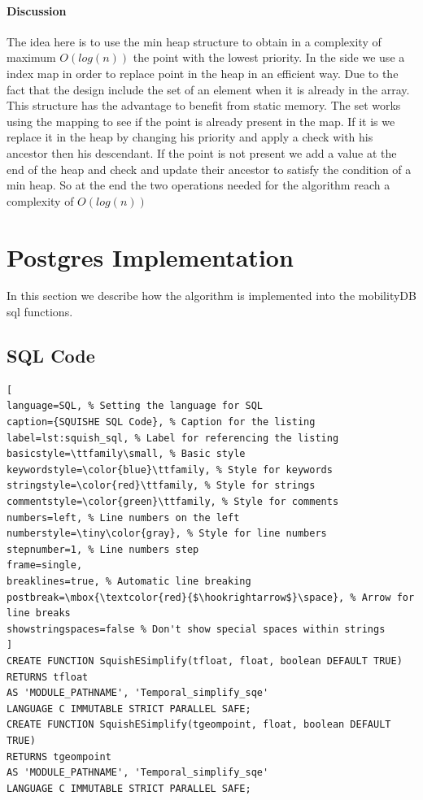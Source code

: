 \paragraph{Discussion}

The idea here is to use the min heap structure to obtain in a complexity of maximum $O(log(n))$  the point with the lowest priority. In the side we use a index map in order to replace point in the heap in an efficient way. Due to the fact that the design include the set of an element when it is already in the array. This structure has the advantage to benefit from static memory. The set works using the mapping to see if the point is already present in the map. If it is we replace it in the heap by changing his priority and apply a check with his ancestor then his descendant. If the point is not present we add a value at the end of the heap and check and update their ancestor to satisfy the condition of a min heap. So at the end the two operations needed for the algorithm reach a complexity of $O(log(n))$

\section{Postgres Implementation}

In this section we describe how the algorithm is implemented into the mobilityDB sql functions.
\subsection{SQL Code}

\begin{lstlisting}[
language=SQL, % Setting the language for SQL
caption={SQUISHE SQL Code}, % Caption for the listing
label=lst:squish_sql, % Label for referencing the listing
basicstyle=\ttfamily\small, % Basic style
keywordstyle=\color{blue}\ttfamily, % Style for keywords
stringstyle=\color{red}\ttfamily, % Style for strings
commentstyle=\color{green}\ttfamily, % Style for comments
numbers=left, % Line numbers on the left
numberstyle=\tiny\color{gray}, % Style for line numbers
stepnumber=1, % Line numbers step
frame=single,
breaklines=true, % Automatic line breaking
postbreak=\mbox{\textcolor{red}{$\hookrightarrow$}\space}, % Arrow for line breaks
showstringspaces=false % Don't show special spaces within strings
]
CREATE FUNCTION SquishESimplify(tfloat, float, boolean DEFAULT TRUE)
RETURNS tfloat
AS 'MODULE_PATHNAME', 'Temporal_simplify_sqe'
LANGUAGE C IMMUTABLE STRICT PARALLEL SAFE;
CREATE FUNCTION SquishESimplify(tgeompoint, float, boolean DEFAULT TRUE)
RETURNS tgeompoint
AS 'MODULE_PATHNAME', 'Temporal_simplify_sqe'
LANGUAGE C IMMUTABLE STRICT PARALLEL SAFE;
\end{lstlisting}

